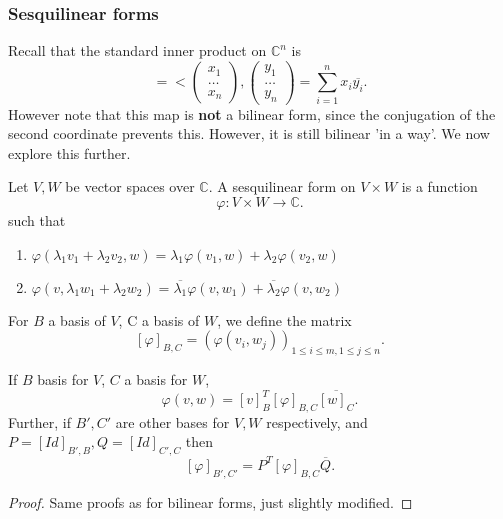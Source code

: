 \documentclass[a4paper]{scrartcl}
\begin{document}
\subsubsection{Sesquilinear forms}
Recall that the standard inner product on $\mathbb{C}^n$ is 
\[<x,y>=<\begin{pmatrix}
x_1\\\ldots \\x_n
\end{pmatrix},\begin{pmatrix}
y_1\\\ldots \\y_n
\end{pmatrix}
=\sum_{i=1}^{n}x_i \overline{y_i}
.\]
However note that this map is \textbf{not} a bilinear form, since the conjugation of the second coordinate prevents this. However, it is still bilinear 'in a way'. We now explore this further.
\begin{definition}
     Let $V,W$ be vector spaces over $\mathbb{C}$. A sesquilinear form on $V \times W$ is a function 
     \[\varphi: V \times W \to \mathbb{C} .\]
     such that 
     \begin{enumerate}
         \item $\varphi (\lambda_1 v_1+ \lambda_2 v_2, w)=\lambda_1 \varphi (v_1,w) + \lambda_2 \varphi (v_2,w)$
         \item $\varphi (v,\lambda_1 w_1+ \lambda_2 w_2)=\overline{\lambda_1} \varphi (v,w_1) + \overline{\lambda_2} \varphi (v,w_2)$
     \end{enumerate}
     For $B$ a basis of $V$, C a basis of $W$, we define the matrix 
     \[[\varphi]_{B,C}=(\varphi (v_i,w_j))_{1 \leq i \leq m, 1 \leq j \leq n}.\]
\end{definition}
\begin{lemma}
     If $B$ basis for $V$, $C$ a basis for $W$,
     \[\varphi (v,w)=[v]_B^T [\varphi]_{B,C}\overline{[w]_C}.\]
     Further, if $B',C'$ are other bases for $V,W$ respectively, and $P=[Id]_{B',B}, Q=[Id]_{C',C}$ then 
     \[[\varphi]_{B',C'}=P^T [\varphi]_{B,C} \overline{Q}.\]
     
\end{lemma}
\begin{proof}
     Same proofs as for bilinear forms, just slightly modified.
\end{proof}
\end{document}
